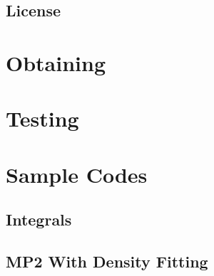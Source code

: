 \documentclass[12pt]{article}
\begin{document}
    \subsection{License} \label{license}
    
\section{Obtaining \PSIfour} \label{svn}
    
\section{Testing} \label{testing}
    
\section{Sample Codes} \label{sample-codes}
    
    \subsection{Integrals} \label{integrals}
    
    \subsection{MP2 With Density Fitting} \label{df-mp2}
    

\newpage
\appendix
\end{document}
